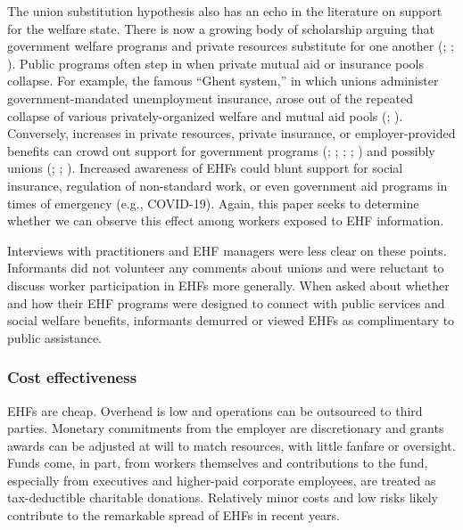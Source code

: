 \documentclass[
  11pt,
  oneside]{article}
\begin{document}
The union substitution hypothesis also has an echo in the literature on support for the welfare state. There is now a growing body of scholarship arguing that government welfare programs and private resources substitute for one another (; ; ). Public programs often step in when private mutual aid or insurance pools collapse. For example, the famous ``Ghent system,'' in which unions administer government-mandated unemployment insurance, arose out of the repeated collapse of various privately-organized welfare and mutual aid pools (; ). Conversely, increases in private resources, private insurance, or employer-provided benefits can crowd out support for government programs (; ; ; ; ) and possibly unions (; ; ). Increased awareness of EHFs could blunt support for social insurance, regulation of non-standard work, or even government aid programs in times of emergency (e.g., COVID-19). Again, this paper seeks to determine whether we can observe this effect among workers exposed to EHF information.

Interviews with practitioners and EHF managers were less clear on these points. Informants did not volunteer any comments about unions and were reluctant to discuss worker participation in EHFs more generally. When asked about whether and how their EHF programs were designed to connect with public services and social welfare benefits, informants demurred or viewed EHFs as complimentary to public assistance.

\subsubsection{Cost effectiveness}\label{cost-effectiveness}

EHFs are cheap. Overhead is low and operations can be outsourced to third parties. Monetary commitments from the employer are discretionary and grants awards can be adjusted at will to match resources, with little fanfare or oversight. Funds come, in part, from workers themselves and contributions to the fund, especially from executives and higher-paid corporate employees, are treated as tax-deductible charitable donations. Relatively minor costs and low risks likely contribute to the remarkable spread of EHFs in recent years.
\end{document}
